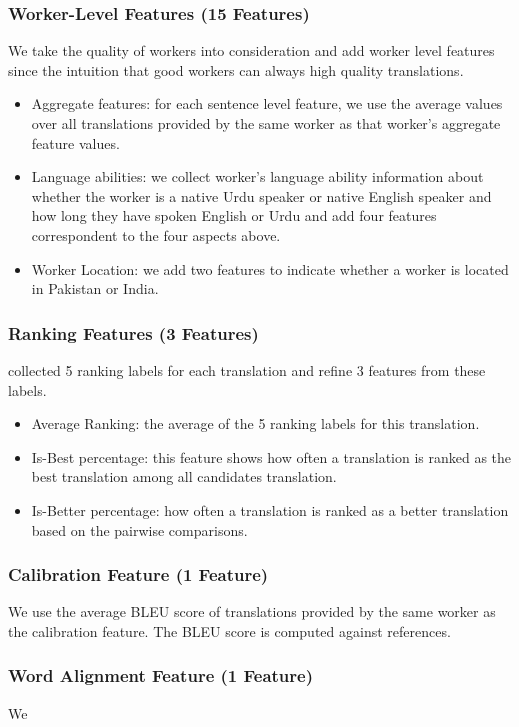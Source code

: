 \documentclass[11pt]{article}
\begin{document}
 \subsubsection*{Worker-Level Features (15 Features)}
 We take the quality of workers into consideration and add worker level features since the intuition that good workers can always high quality translations.
\begin{itemize}
\item	Aggregate features:	for each sentence level feature, we use the average values over all translations provided by the same worker as that worker's aggregate feature values.
\item	Language abilities:	we collect worker's language ability information about whether the worker is a native Urdu speaker or native English speaker and how long they have spoken English or Urdu and add four features correspondent to the four aspects above.
\item	Worker Location:	we add two features to indicate whether a worker is located in Pakistan or India.
\end{itemize}
 \subsubsection*{Ranking Features (3 Features)}
  collected 5 ranking labels for each translation and refine 3 features from these labels.
 \begin{itemize}
 \item Average Ranking:	the average of the 5 ranking labels for this translation.
 \item Is-Best percentage: this feature shows how often a translation is ranked as the best translation among all candidates translation.
 \item Is-Better percentage: how often a translation is ranked as a better translation based on the pairwise comparisons.
 \end{itemize}
 \subsubsection*{Calibration Feature (1 Feature)}
 We use the average BLEU score of  translations provided by the same worker  as  the calibration feature.
  The BLEU score is computed against references. 
  \subsubsection*{Word Alignment Feature (1 Feature)}
  We 
\end{document}
